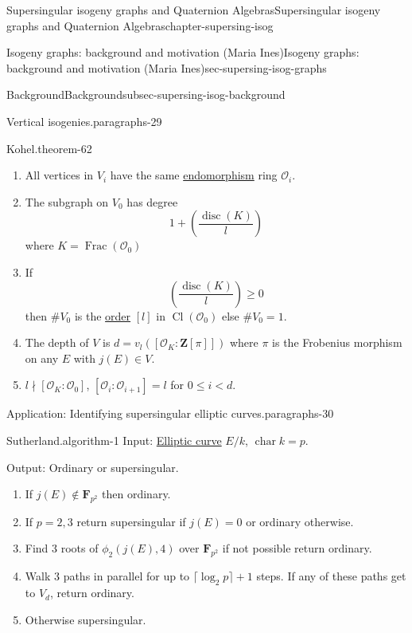 \documentclass[oneside,10pt,]{book}
\numberwithin{equation}{section}
\newcommand{\lb}{[}
\newcommand{\rb}{]}
\newcommand{\ZZ}{\mathbf{Z}}
\newcommand{\FF}{\mathbf{F}}
\newcommand{\ints}{\mathcal{O}}
\DeclareMathOperator{\Cl}{Cl}
\DeclareMathOperator{\disc}{disc}
\DeclareMathOperator{\characteristic}{char}
\DeclareMathOperator{\Frac}{Frac}
\newcommand{\lt}{<}
\begin{document}
\begin{chapterptx}{Supersingular isogeny graphs and Quaternion Algebras}{}{Supersingular isogeny graphs and Quaternion Algebras}{}{}{chapter-supersing-isog}
\begin{sectionptx}{Isogeny graphs: background and motivation (Maria Ines)}{}{Isogeny graphs: background and motivation (Maria Ines)}{}{}{sec-supersing-isog-graphs}
\begin{subsectionptx}{Background}{}{Background}{}{}{subsec-supersing-isog-background}
\begin{paragraphs}{Vertical isogenies.}{paragraphs-29}
\begin{theorem}{Kohel.}{}{theorem-62}
\begin{enumerate}
\item\hypertarget{li-200}{}All vertices in \(V_i\) have the same \hyperref[def-supersing-isog-endo]{endomorphism} ring \(\ints_i\).%
\item\hypertarget{li-201}{}The subgraph on \(V_0\) has degree%
\begin{equation*}
1+ \left(\frac {\disc(K)}{l}\right)
\end{equation*}
where \(K = \Frac(\ints_0)\)%
\item\hypertarget{li-202}{}If%
\begin{equation*}
\left(\frac {\disc(K)}{l}\right) \ge 0
\end{equation*}
then \(\#V_0\) is the \hyperref[def-order-quaternion]{order} \(\lb l \rb\) in \(\Cl (\ints_0)\) else \(\#V_0 = 1\).%
\item\hypertarget{li-203}{}The depth of \(V\) is \(d = v_l (\lb \ints_K : \ZZ\lb\pi \rb\rb)\) where \(\pi\) is the Frobenius morphism on any \(E\) with \(j(E) \in V\).%
\item\hypertarget{li-204}{}\(l \nmid \lb \ints_K : \ints_0 \rb\), \(\lb \ints_i : \ints_{i+1}\rb = l\) for \(0\le i \lt d\).%
\end{enumerate}
%
\end{theorem}
\end{paragraphs}%
\begin{paragraphs}{Application: Identifying supersingular elliptic curves.}{paragraphs-30}%
\begin{algorithm}{Sutherland.}{}{algorithm-1}%
\hypertarget{p-820}{}%
Input: \hyperref[def-supersing-isog-ec]{Elliptic curve} \(E/k\), \(\characteristic k = p\).%
\par
\hypertarget{p-821}{}%
Output: Ordinary or supersingular.%
\par
\hypertarget{p-822}{}%
\leavevmode%
\begin{enumerate}
\item\hypertarget{li-205}{}If \(j(E) \not \in \FF_{p^2}\) then ordinary.%
\item\hypertarget{li-206}{}If \(p  =2,3\) return supersingular if \(j(E) = 0\) or ordinary otherwise.%
\item\hypertarget{li-207}{}Find 3 roots of \(\phi_2(j(E), 4)\) over \(\FF_{p^2}\) if not possible return ordinary.%
\item\hypertarget{li-208}{}Walk 3 paths in parallel for up to \(\lceil \log_2 p \rceil + 1 \) steps. If any of these paths get to \(V_d\), return ordinary.%
\item\hypertarget{li-209}{}Otherwise supersingular.%

\end{enumerate}
\end{algorithm}
\end{paragraphs}
\end{subsectionptx}
\end{sectionptx}
\end{chapterptx}
\end{document}
